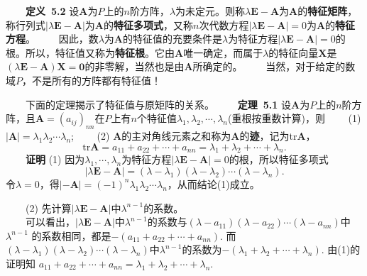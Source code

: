 \documentclass[compress,mathserif,cjk]{beamer}
\theoremstyle{remark}
\numberwithin{equation}{section}
\newcommand{\hei}{\bf}      %
\begin{document}
\begin{CJK}{UTF8}{gbsn}
\begin{frame}
\end{frame}

\begin{frame}
 \ \ \ \ {\hei 定义~5.2} 设$\bm A$为$P$上的$n$阶方阵，$\lambda$为未定元。则称$\lambda\bm E-\bm A$为$\bm A$的{\hei 特征矩阵}，称行列式$|\lambda\bm E-\bm A|$为$\bm A$的{\hei 特征多项式}，又称$n$次代数方程$|\lambda\bm E-\bm A|=0$为$\bm A$的{\hei 特征方程}。
 \pause\vskip 10pt
 \ \ \ \ 因此，数$\lambda$为$\bm A$的特征值的充要条件是$\lambda$为特征方程$|\lambda\bm E-\bm A|=0$的根。所以，特征值又称为{\hei 特征根}。它由$\bm A$唯一确定，而属于$\lambda$的特征向量$\bm X$是$(\lambda\bm E-\bm A)\bm X=\bm 0$的非零解，当然也是由$\bm A$所确定的。
  \pause\vskip 5pt
 \ \ \ \ 当然，对于给定的数域$P$，不是所有的方阵都有特征值！
\end{frame}

\begin{frame}
 \ \ \ \ 下面的定理揭示了特征值与原矩阵的关系。
 \vskip 5pt
 \ \ \ \ {\hei 定理~5.1} 设$\bm A$为$P$上的$n$阶方阵，且$\bm A=(a_{ij})_{nn}$在$P$上有$n$个特征值$\lambda_1,\lambda_2,\cdots,\lambda_n$(重根按重数计算)，则
 \vskip 5pt
 \ \ \ \ (1) $|\bm A|=\lambda_1\lambda_2\cdots\lambda_n$;
 \vskip 5pt
 \ \ \ \ (2) $\bm A$的主对角线元素之和称为$\bm A$的{\hei 迹}，记为tr$\bm A$，
 $$\mathrm{tr}\bm A=a_{11}+a_{22}+\cdots+a_{nn}=\lambda_1+\lambda_2+\cdots+\lambda_n.$$
 \pause
 \ \ \ \ {\hei 证明} (1) 因为$\lambda_1,\cdots,\lambda_n$为特征方程$|\lambda\bm E-\bm A|=0$的根，所以特征多项式
 $$|\lambda\bm E-\bm A|=(\lambda-\lambda_1)(\lambda-\lambda_2)\cdots(\lambda-\lambda_n).$$
 令$\lambda=0$，得$|-\bm A|=(-1)^n\lambda_1\lambda_2\cdots\lambda_n$，从而结论(1)成立。
 \end{frame}

\begin{frame}
 \ \ \ \ (2) 先计算$|\lambda\bm E-\bm A|$中$\lambda^{n-1}$的系数。\\
 \vskip 5pt
 \ \ \ \ 可以看出，$|\lambda\bm E-\bm A|$中$\lambda^{n-1}$的系数与$(\lambda-a_{11})(\lambda-a_{22})\cdots(\lambda-a_{nn})$中$\lambda^{n-1}$ 的系数相同，都是$-(a_{11}+a_{22}+\cdots+a_{nn})$. 而$(\lambda-\lambda_1)(\lambda-\lambda_2)\cdots(\lambda-\lambda_n)$中$\lambda^{n-1}$的系数为$-(\lambda_1+\lambda_2+\cdots+\lambda_n)$. 由(1)的证明知
 \vskip 1pt
\hspace{6em}  $a_{11}+a_{22}+\cdots+a_{nn}=\lambda_1+\lambda_2+\cdots+\lambda_n.$
\end{frame}


\end{CJK}
\end{document}
